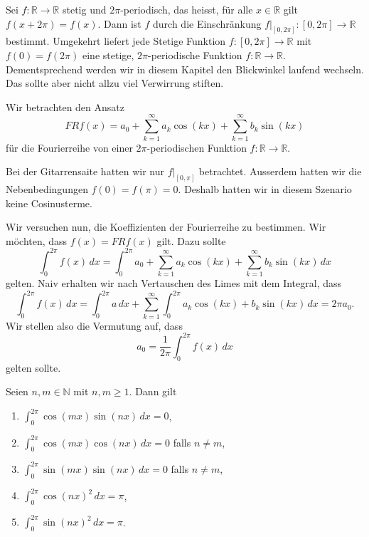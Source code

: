 \documentclass[../main.tex]{subfiles}
\begin{document}
Sei $f \colon \mathbb{R} \to \mathbb{R}$ stetig
und $2 \pi $-periodisch, das heisst, für alle
$x \in \mathbb{R}$ gilt $f(x + 2 \pi ) = f(x)$.
Dann ist $f$ durch die Einschränkung
$f|_{[0, 2\pi]} \colon [0, 2\pi] \to \mathbb{R}$ bestimmt.
Umgekehrt liefert jede Stetige Funktion
$f \colon[0, 2\pi] \to \mathbb{R}$ mit $f(0) = f(2\pi)$
eine stetige, $2\pi$-periodische Funktion
$f \colon \mathbb{R} \to \mathbb{R}$.
Dementsprechend werden wir in diesem Kapitel
den Blickwinkel laufend wechseln. Das sollte aber nicht
allzu viel Verwirrung stiften.

Wir betrachten den Ansatz
\[
  FR f(x) = a_0 + \sum_{k=1}^{\infty} a_k \cos(kx)
  + \sum_{k=1}^{\infty} b_k \sin(kx)
\]
für die Fourierreihe von einer
$2\pi$-periodischen Funktion $f \colon \mathbb{R} \to \mathbb{R}$.

\begin{remark}
  Bei der Gitarrensaite hatten wir nur
  $f|_{[0, \pi]}$ betrachtet. Ausserdem hatten wir die
  Nebenbedingungen $f(0) = f(\pi) = 0$.
  Deshalb hatten wir in diesem Szenario keine Cosinusterme.
\end{remark}

Wir versuchen nun, die Koeffizienten der Fourierreihe zu bestimmen.
Wir möchten, dass $f(x) = FR f(x)$ gilt. Dazu sollte
\[
  \int_{0}^{2\pi} f(x) \, dx 
  = \int_{0}^{2\pi} a_0 +  \sum_{k=1}^{\infty} a_k \cos(kx)
  + \sum_{k=1}^{\infty} b_k \sin(kx)
  \, dx
\]
gelten. Naiv erhalten wir nach Vertauschen des Limes mit dem Integral, dass
\[
  \int_{0}^{2\pi} f(x) \, dx =
  \int_{0}^{2\pi} a \, dx + \sum_{k=1}^{\infty} \int_{0}^{2\pi} a_k \cos (kx)
  + b_k \sin(kx)\, dx = 2\pi a_0.
\]
Wir stellen also die Vermutung auf, dass
\[
  a_0 = \frac{1}{2\pi} \int_{0}^{2\pi} f(x) \, dx
\]
gelten sollte.

\begin{lemma*}
  Seien $n, m \in \mathbb{N}$ mit $n, m \geq 1$.
  Dann gilt
  \begin{enumerate}[\normalfont(i)]
    \item $\int_{0}^{2\pi} \cos(mx) \sin(nx) \, dx = 0$,
    \item $\int_{0}^{2\pi} \cos(mx) \cos(nx) \, dx = 0$ falls $n \neq m$,
    \item $\int_{0}^{2\pi} \sin(mx) \sin(nx) \, dx = 0$ falls $n \neq m$,
    \item $\int_{0}^{2\pi} {\cos(nx)}^2 \, dx = \pi$,
    \item $\int_{0}^{2\pi} {\sin(nx)}^2 \, dx = \pi$.
  \end{enumerate}
\end{lemma*}
\end{document}
